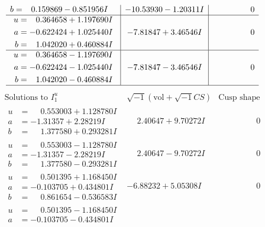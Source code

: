 \documentclass[1p]{elsarticle_modified}
\theoremstyle{definition}
\newcommand{\I}{\sqrt{-1}}
\begin{document}
$$\begin{array}{c|c|c}
\begin{aligned}
b &= \phantom{-}0.159869 - 0.851956 I\end{aligned}
 & -10.53930 - 1.20311 I & \phantom{-0.000000 } 0 \\ \hline\begin{aligned}
u &= \phantom{-}0.364658 + 1.197690 I \\
a &= -0.622424 + 1.025440 I \\
b &= \phantom{-}1.042020 + 0.460884 I\end{aligned}
 & -7.81847 + 3.46546 I & \phantom{-0.000000 } 0 \\ \hline\begin{aligned}
u &= \phantom{-}0.364658 - 1.197690 I \\
a &= -0.622424 - 1.025440 I \\
b &= \phantom{-}1.042020 - 0.460884 I\end{aligned}
 & -7.81847 - 3.46546 I & \phantom{-0.000000 } 0\\
 \hline 
 \end{array}$$\newpage$$\begin{array}{c|c|c}  
\text{Solutions to }I^u_{1}& \I (\text{vol} + \sqrt{-1}CS) & \text{Cusp shape}\\
 \hline 
\begin{aligned}
u &= \phantom{-}0.553003 + 1.128780 I \\
a &= -1.31357 + 2.28219 I \\
b &= \phantom{-}1.377580 + 0.293281 I\end{aligned}
 & \phantom{-}2.40647 + 9.70272 I & \phantom{-0.000000 } 0 \\ \hline\begin{aligned}
u &= \phantom{-}0.553003 - 1.128780 I \\
a &= -1.31357 - 2.28219 I \\
b &= \phantom{-}1.377580 - 0.293281 I\end{aligned}
 & \phantom{-}2.40647 - 9.70272 I & \phantom{-0.000000 } 0 \\ \hline\begin{aligned}
u &= \phantom{-}0.501395 + 1.168450 I \\
a &= -0.103705 + 0.434801 I \\
b &= \phantom{-}0.861654 - 0.536583 I\end{aligned}
 & -6.88232 + 5.05308 I & \phantom{-0.000000 } 0 \\ \hline\begin{aligned}
u &= \phantom{-}0.501395 - 1.168450 I \\
a &= -0.103705 - 0.434801 I \\

\end{aligned}
\end{array}$$
\end{document}

